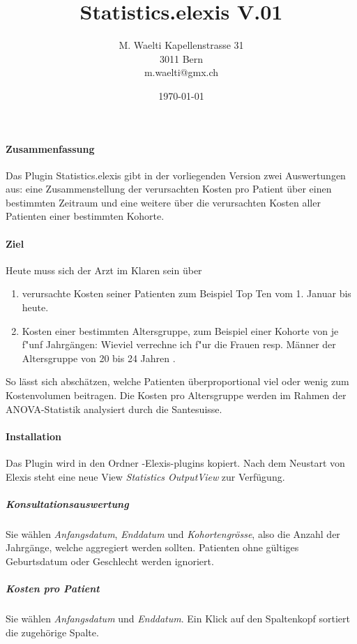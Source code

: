 \documentclass[smallheadings,headsepline,12pt,a4paper,pagenumber=false]{scrartcl}
\begin{document}
\title{Statistics.elexis V.01} %
\author{M. Waelti Kapellenstrasse 31\\3011 Bern\\m.waelti@gmx.ch}
\date{\today}
\maketitle
\paragraph{Zusammenfassung}
Das Plugin Statistics.elexis gibt in der vorliegenden Version zwei Auswertungen aus: eine Zusammenstellung der verursachten Kosten pro Patient \"uber einen bestimmten Zeitraum und eine weitere \"uber die verursachten Kosten aller Patienten einer bestimmten Kohorte.
\paragraph{Ziel}
Heute muss sich der Arzt im Klaren sein \"uber
\begin{enumerate}
\item verursachte Kosten seiner Patienten zum Beispiel Top Ten vom 1. Januar bis heute.

\item Kosten einer bestimmten Altersgruppe, zum Beispiel einer Kohorte von je f"unf Jahrg\"angen: Wieviel verrechne ich f"ur die Frauen resp. M\"anner der Altersgruppe von 20 bis 24 Jahren .

\end{enumerate}
So l\"asst sich absch\"atzen, welche Patienten \"uberproportional viel oder wenig zum Kostenvolumen beitragen. Die Kosten pro Altersgruppe werden im Rahmen der ANOVA-Statistik analysiert durch die Santesuisse.
\paragraph{Installation}
Das Plugin wird in den Ordner -Elexis-plugins kopiert. Nach dem Neustart von Elexis steht eine neue View \textit{Statistics OutputView} zur Verf\"ugung.
\subparagraph{Konsultationsauswertung} Sie wählen \textit{Anfangsdatum},  \textit{Enddatum} und \textit {Kohortengrösse}, also die Anzahl der Jahrgänge, welche aggregiert werden sollten. Patienten ohne gültiges Geburtsdatum oder Geschlecht werden ignoriert.
\subparagraph{Kosten pro Patient} Sie wählen \textit{Anfangsdatum} und \textit{Enddatum}. Ein Klick auf den Spaltenkopf sortiert die zugehörige Spalte.
\end{document}
